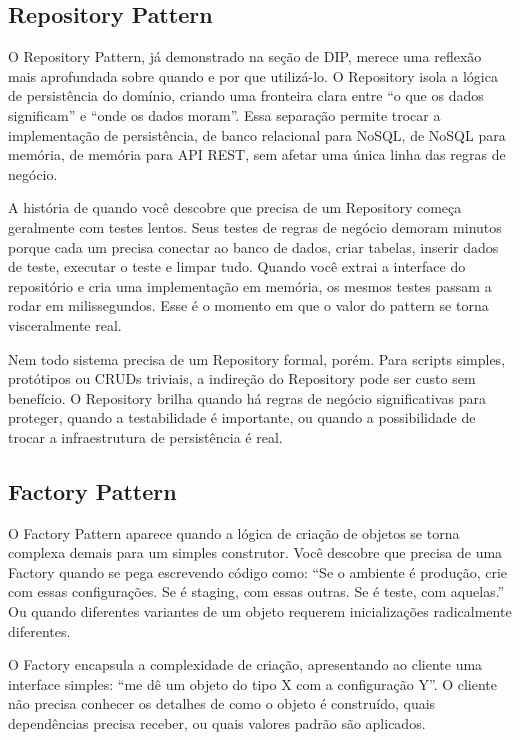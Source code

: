 \subsection{Repository Pattern}

O Repository Pattern, já demonstrado na seção de DIP, merece uma reflexão
mais aprofundada sobre quando e por que utilizá-lo. O Repository isola a lógica
de persistência do domínio, criando uma fronteira clara entre ``o que os dados
significam'' e ``onde os dados moram''. Essa separação permite trocar a
implementação de persistência, de banco relacional para NoSQL, de NoSQL
para memória, de memória para API REST, sem afetar uma única linha das
regras de negócio.

A história de quando você descobre que precisa de um Repository começa
geralmente com testes lentos. Seus testes de regras de negócio demoram
minutos porque cada um precisa conectar ao banco de dados, criar tabelas,
inserir dados de teste, executar o teste e limpar tudo. Quando você extrai
a interface do repositório e cria uma implementação em memória, os mesmos
testes passam a rodar em milissegundos. Esse é o momento em que o valor do
pattern se torna visceralmente real.

Nem todo sistema precisa de um Repository formal, porém. Para scripts
simples, protótipos ou CRUDs triviais, a indireção do
Repository pode ser custo sem benefício. O Repository brilha quando há regras
de negócio significativas para proteger, quando a testabilidade é importante,
ou quando a possibilidade de trocar a infraestrutura de persistência é real.

\subsection{Factory Pattern}

O Factory Pattern aparece quando a lógica de criação de objetos se torna
complexa demais para um simples construtor. Você descobre que precisa de
uma Factory quando se pega escrevendo código como: ``Se o ambiente é
produção, crie com essas configurações. Se é staging, com essas outras. Se
é teste, com aquelas.'' Ou quando diferentes variantes de um objeto requerem
inicializações radicalmente diferentes.

O Factory encapsula a complexidade de criação, apresentando ao cliente uma
interface simples: ``me dê um objeto do tipo X com a configuração Y''. O
cliente não precisa conhecer os detalhes de como o objeto é construído,
quais dependências precisa receber, ou quais valores padrão são aplicados.

